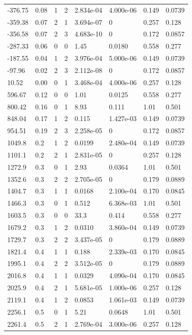 \documentclass[preview]{standalone}
\begin{document}
{{\begin{tabular}{L{1.2cm}C{1.2cm} C{0.3cm}C{0.5cm} C{1.4cm}C{1.4cm} C{1.4cm}C{1.4cm}}
  -376.75  &  0.08  & 1     &  2 &  2.834e-04  & 4.000e-06  & 0.149 &  0.0739   \\ 
  -359.38  &  0.07  & 2     &  1 &  3.694e-07  & 0  & 0.257 &  0.128   \\ 
  -356.58  &  0.07  & 2     &  3 &  4.683e-10  & 0  & 0.172 &  0.0857   \\ 
  -287.33  &  0.06  & 0     &  0 &  1.45  & 0.0180  & 0.558 &  0.277   \\ 
  -187.55  &  0.04  & 1     &  2 &  3.976e-04  & 5.000e-06  & 0.149 &  0.0739   \\ 
  -97.96  &  0.02  & 2     &  3 &  2.112e-08  & 0  & 0.172 &  0.0857   \\ 
  10.52  &  0.00  & 0     &  1 &  3.468e-04  & 4.000e-06  & 0.257 &  0.128   \\ 
  596.67  &  0.12  & 0     &  0 &  1.01  & 0.0125  & 0.558 &  0.277   \\ 
  800.42  &  0.16  & 0     &  1 &  8.93  & 0.111  & 1.01 &  0.501   \\ 
  848.04  &  0.17  & 1     &  2 &  0.115  & 1.427e-03  & 0.149 &  0.0739   \\ 
  954.51  &  0.19  & 2     &  3 &  2.258e-05  & 0  & 0.172 &  0.0857   \\ 
  1049.8  &   0.2  & 1     &  2 &  0.0199  & 2.480e-04  & 0.149 &  0.0739   \\ 
  1101.1  &   0.2  & 2     &  1 &  2.831e-05  & 0  & 0.257 &  0.128   \\ 
  1272.9  &   0.3  & 0     &  1 &  2.93  & 0.0364  & 1.01 &  0.501   \\ 
  1352.6  &   0.3  & 2     &  2 &  2.705e-05  & 0  & 0.179 &  0.0889   \\ 
  1404.7  &   0.3  & 1     &  1 &  0.0168  & 2.100e-04  & 0.170 &  0.0845   \\ 
  1466.3  &   0.3  & 0     &  1 &  0.512  & 6.368e-03  & 1.01 &  0.501   \\ 
  1603.5  &   0.3  & 0     &  0 &  33.3  & 0.414  & 0.558 &  0.277   \\ 
  1679.2  &   0.3  & 1     &  2 &  0.0310  & 3.860e-04  & 0.149 &  0.0739   \\ 
  1729.7  &   0.3  & 2     &  2 &  3.437e-05  & 0  & 0.179 &  0.0889   \\ 
  1821.4  &   0.4  & 1     &  1 &  0.188  & 2.339e-03  & 0.170 &  0.0845   \\ 
  1995.1  &   0.4  & 2     &  2 &  3.512e-05  & 0  & 0.179 &  0.0889   \\ 
  2016.8  &   0.4  & 1     &  1 &  0.0329  & 4.090e-04  & 0.170 &  0.0845   \\ 
  2025.9  &   0.4  & 2     &  1 &  5.681e-05  & 1.000e-06  & 0.257 &  0.128   \\ 
  2119.1  &   0.4  & 1     &  2 &  0.0853  & 1.061e-03  & 0.149 &  0.0739   \\ 
  2256.1  &   0.5  & 0     &  1 &  5.21  & 0.0648  & 1.01 &  0.501   \\ 
  2261.4  &   0.5  & 2     &  1 &  2.769e-04  & 3.000e-06  & 0.257 &  0.128   \\ 
\hline 
\end{tabular} 

}}
\end{document}
